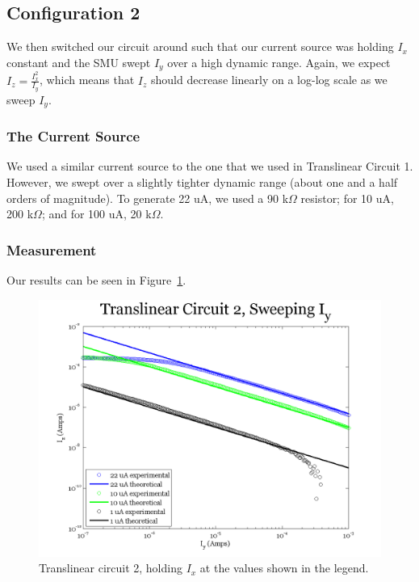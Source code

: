 \documentclass{article}
\begin{document}
\subsection*{Configuration 2}

We then switched our circuit around such that our current source was holding $I_x$ constant and the SMU swept $I_y$ over a high dynamic range.  Again, we expect $I_z = \frac{I_x^2}{I_y}$, which means that $I_z$ should decrease linearly on a log-log scale as we sweep $I_y$.  

\subsubsection*{The Current Source}

We used a similar current source to the one that we used in Translinear Circuit 1.  However, we swept over a slightly tighter dynamic range (about one and a half orders of magnitude).  To generate 22 uA, we used a 90 k$\Omega$ resistor; for 10 uA, 200 k$\Omega$; and for 100 uA, 20 k$\Omega$.

\subsubsection*{Measurement}

Our results can be seen in Figure~\ref{fig:tl2sweepy}.

\begin{figure}[H]
\begin{center}
\includegraphics[scale=.75]{exp3_sweepy.png}
\caption{Translinear circuit 2, holding $I_x$ at the values shown in the legend.}
\label{fig:tl2sweepy}
\end{center}
\end{figure}
\end{document}
